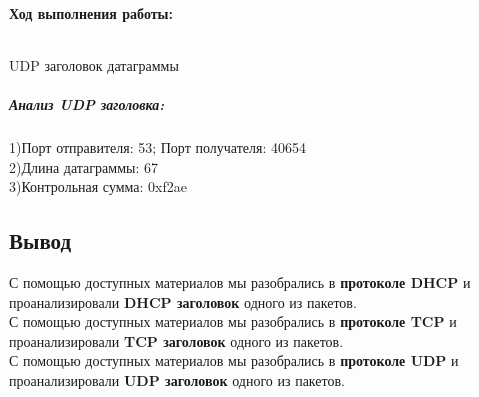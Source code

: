 \paragraph{Ход выполнения работы:}
\begin{code}
	\inputminted[breaklines=true, xleftmargin=1em, linenos, frame=single, framesep=10pt, fontsize=\footnotesize, firstline=1, lastline=33]{haskell}{fig/udp.bash}
	\caption{UDP заголовок датаграммы}
    \end{code}
    
\subparagraph{Анализ UDP заголовка:\\}
1)Порт отправителя: 53; Порт получателя: 40654\\


2)Длина датаграммы: 67\\


3)Контрольная сумма: 0xf2ae

\subsection{Вывод}

С помощью доступных материалов мы разобрались в \textbf{протоколе DHCP} и проанализировали \textbf{DHCP заголовок} одного из пакетов.\\
С помощью доступных материалов мы разобрались в \textbf{протоколе TCP} и проанализировали \textbf{TCP заголовок} одного из пакетов.\\
С помощью доступных материалов мы разобрались в \textbf{протоколе UDP} и проанализировали \textbf{UDP заголовок} одного из пакетов.